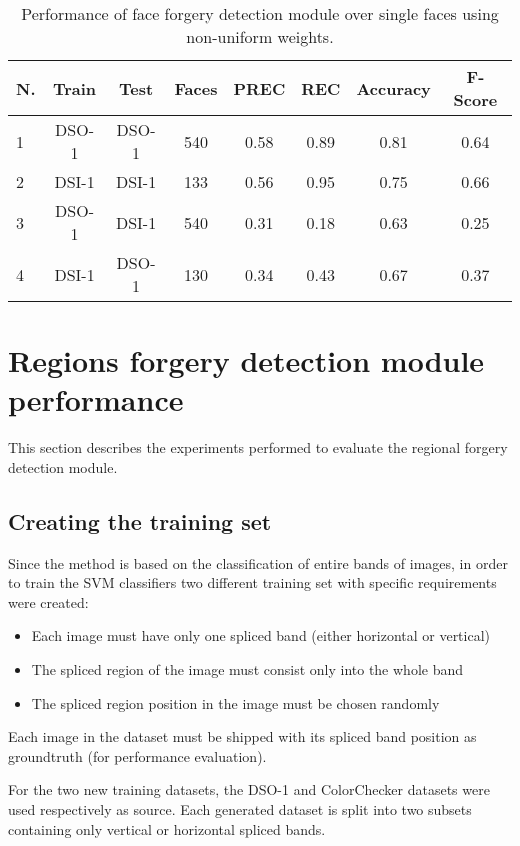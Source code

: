 \begin{table}[h!]
\centering
\begin{tabular}{l c c c c c c c} 
\hline \hline 
\textbf{N.} & \textbf{Train} & \textbf{Test} & \textbf{Faces} & \textbf{PREC} & \textbf{REC} & \textbf{Accuracy} & \textbf{F-Score} \\ [0.5ex]
\hline
1 & DSO-1 & DSO-1 &	540 & 0.58 & 0.89 & 0.81	& 0.64\\
2 & DSI-1 & DSI-1 &	133 & 0.56 & 0.95 & 0.75 & 0.66\\
3 &	DSO-1 & DSI-1 & 540 & 0.31 & 0.18 & 0.63 & 0.25\\ 
4 &	DSI-1 &	DSO-1 &	130 & 0.34 & 0.43 & 0.67 & 0.37\\[1ex]

\hline
\end{tabular}
\caption{Performance of face forgery detection module over single faces using non-uniform weights.}
\label{table:forgerydetections}
\end{table}


\section{Regions forgery detection module performance}

This section describes the experiments performed to evaluate the regional forgery detection module.

\subsection{Creating the training set}

Since the method is based on the classification of entire bands of images, in order to train the SVM classifiers two different training set with specific requirements were created:
\begin{itemize}
\item Each image must have only one spliced band (either horizontal or vertical)
\item The spliced region of the image must consist only into the whole band
\item The spliced region position in the image must be chosen randomly
\end{itemize}

Each image in the dataset must be shipped with its spliced band position as groundtruth (for performance evaluation).

For the two new training datasets, the DSO-1 and ColorChecker datasets were used respectively as source. Each generated dataset is split into two subsets containing only vertical or horizontal spliced bands.

